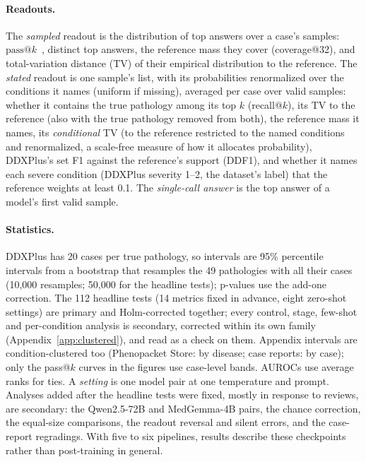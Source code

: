 \documentclass[wcp]{jmlr}
\makeatletter
\newcommand{\passk}[1]{\mathrm{pass@}#1}
\makeatother
\begin{document}
\paragraph{Readouts.}
The \emph{sampled} readout is the distribution of top answers over a case's samples: $\passk{k}$~\citep{chen2021codex}, distinct top answers, the reference mass they cover (coverage@32), and total-variation distance (TV) of their empirical distribution to the reference.
The \emph{stated} readout is one sample's list, with its probabilities renormalized over the conditions it names (uniform if missing), averaged per case over valid samples: whether it contains the true pathology among its top $k$ (recall@$k$), its TV to the reference (also with the true pathology removed from both), the reference mass it names, its \emph{conditional} TV (to the reference restricted to the named conditions and renormalized, a scale-free measure of how it allocates probability), DDXPlus's set F1 against the reference's support (DDF1), and whether it names each severe condition (DDXPlus severity 1--2, the dataset's label) that the reference weights at least 0.1.
The \emph{single-call answer} is the top answer of a model's first valid sample.

\paragraph{Statistics.}
DDXPlus has 20 cases per true pathology, so intervals are 95\% percentile intervals from a bootstrap that resamples the 49 pathologies with all their cases (10,000 resamples; 50,000 for the headline tests); p-values use the add-one correction. The 112 headline tests (14 metrics fixed in advance, eight zero-shot settings) are primary and Holm-corrected together; every control, stage, few-shot and per-condition analysis is secondary, corrected within its own family (Appendix~\ref{app:clustered}), and read as a check on them. Appendix intervals are condition-clustered too (Phenopacket Store: by disease; case reports: by case); only the pass@$k$ curves in the figures use case-level bands. AUROCs use average ranks for ties. A \emph{setting} is one model pair at one temperature and prompt. Analyses added after the headline tests were fixed, mostly in response to reviews, are secondary: the Qwen2.5-72B and MedGemma-4B pairs, the chance correction, the equal-size comparisons, the readout reversal and silent errors, and the case-report regradings. With five to six pipelines, results describe these checkpoints rather than post-training in general.
\end{document}
